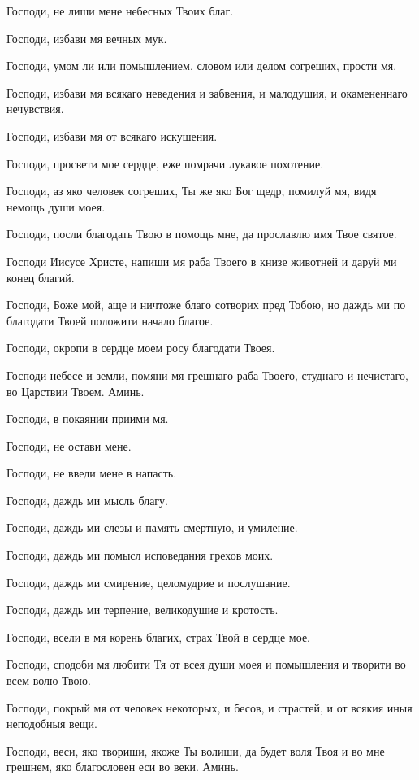 \begin{mymulticols}

Господи, не лиши мене небесных Твоих благ.

Господи, избави мя вечных мук.

Господи, умом ли или помышлением, словом или делом согреших, прости мя.

Господи, избави мя всякаго неведения и забвения, и малодушия, и окамененнаго нечувствия.

Господи, избави мя от всякаго искушения.

Господи, просвети мое сердце, еже помрачи лукавое похотение.

Господи, аз яко человек согреших, Ты же яко Бог щедр, помилуй мя, видя немощь души моея.

Господи, посли благодать Твою в помощь мне, да прославлю имя Твое святое.

Господи Иисусе Христе, напиши мя раба Твоего в книзе животней и даруй ми конец благий.

Господи, Боже мой, аще и ничтоже благо сотворих пред Тобою, но даждь ми по благодати Твоей положити начало благое.

Господи, окропи в сердце моем росу благодати Твоея.

Господи небесе и земли, помяни мя грешнаго раба Твоего, студнаго и нечистаго, во Царствии Твоем. Аминь.

Господи, в покаянии приими мя.

Господи, не остави мене.

Господи, не введи мене в напасть.

Господи, даждь ми мысль благу.

Господи, даждь ми слезы и память смертную, и умиление.

Господи, даждь ми помысл исповедания грехов моих.

Господи, даждь ми смирение, целомудрие и послушание.

Господи, даждь ми терпение, великодушие и кротость.

Господи, всели в мя корень благих, страх Твой в сердце мое.

Господи, сподоби мя любити Тя от всея души моея и помышления и творити во всем волю Твою.

Господи, покрый мя от человек некоторых, и бесов, и страстей, и от всякия иныя неподобныя вещи.

Господи, веси, яко твориши, якоже Ты волиши, да будет воля Твоя и во мне грешнем, яко благословен еси во веки. Аминь.


\end{mymulticols}
